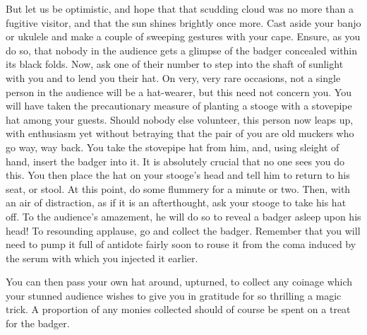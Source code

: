 But let us be optimistic, and hope that that scudding cloud was no more than a fugitive visitor, and that the sun shines brightly once more. Cast aside your banjo or ukulele and make a couple of sweeping gestures with your cape. Ensure, as you do so, that nobody in the audience gets a glimpse of the badger concealed within its black folds. Now, ask one of their number to step into the shaft of sunlight with you and to lend you their hat. On very, very rare occasions, not a single person in the audience will be a hat-wearer, but this need not concern you. You will have taken the precautionary measure of planting a stooge with a stovepipe hat among your guests. Should nobody else volunteer, this person now leaps up, with enthusiasm yet without betraying that the pair of you are old muckers who go way, way back. You take the stovepipe hat from him, and, using sleight of hand, insert the badger into it. It is absolutely crucial that no one sees you do this. You then place the hat on your stooge's head and tell him to return to his seat, or stool. At this point, do some flummery for a minute or two. Then, with an air of distraction, as if it is an afterthought, ask your stooge to take his hat off. To the audience's amazement, he will do so to reveal a badger asleep upon his head! To resounding applause, go and collect the badger. Remember that you will need to pump it full of antidote fairly soon to rouse it from the coma induced by the serum with which you injected it earlier.

You can then pass your own hat around, upturned, to collect any coinage which your stunned audience wishes to give you in gratitude for so thrilling a magic trick. A proportion of any monies collected should of course be spent on a treat for the badger.